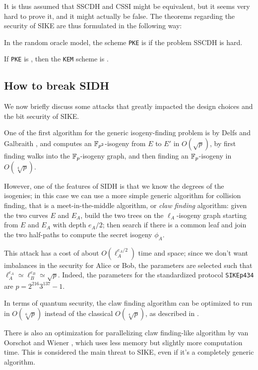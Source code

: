 It is thus assumed that SSCDH and CSSI might be equivalent, but it seems very hard to prove it, and it might actually be false. The theorems regarding the security of SIKE are thus formulated in the following way:

\begin{theorem}
    In the random oracle model, the scheme \texttt{PKE} is \indcpa if the problem SSCDH is hard.
\end{theorem}

\begin{theorem}
    If \texttt{PKE} is \indcpa, then the \texttt{KEM} scheme is \indcca.
\end{theorem}


\subsection{How to break SIDH}
We now briefly discuss some attacks that greatly impacted the design choices and the bit security of SIKE.

One of the first algorithm for the generic isogeny-finding problem is by Delfs and Galbraith \cite{Delfs_Galbraith}, and computes an $\mathbb{F}_{p^2}$-isogeny from $E$ to $E'$ in $O(\sqrt p)$, by first finding walks into the $\mathbb{F}_p$-isogeny graph, and then finding an $\mathbb{F}_p$-isogeny in $O(\sqrt[4]p)$.

However, one of the features of SIDH is that we know the degrees of the isogenies; in this case we can use a more simple generic algorithm for collision finding, that is a meet-in-the-middle algorithm, or \emph{claw finding} algorithm: given the two curves $E$ and $E_A$, build the two trees on the $\ell_A$-isogeny graph starting from $E$ and $E_A$ with depth $e_A/2$; then search if there is a common leaf and join the two half-paths to compute the secret isogeny $\phi_A$.

This attack has a cost of about $O(\ell_A^{e_A/2})$ time and space; since we don't want imbalances in the security for Alice or Bob, the parameters are selected such that $\ell_A^{e_A}\simeq \ell_B^{e_B}\simeq \sqrt{p}$. Indeed, the parameters for the standardized protocol \texttt{SIKEp434} are $p=2^{216}3^{137}-1$.

In terms of quantum security, the claw finding algorithm can be optimized to run in $O(\sqrt[6]{p})$ instead of the classical $O(\sqrt[4]{p})$, as described in \cite{Tani_claw}.

There is also an optimization for parallelizing claw finding-like algorithm by van Oorschot and Wiener \cite{vOW}, which uses less memory but slightly more computation time. This is considered the main threat to SIKE, even if it's a completely generic algorithm.


